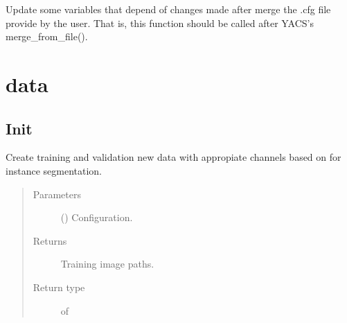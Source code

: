 \documentclass[letterpaper,10pt,english]{sphinxmanual}
\begin{document}
\begin{fulllineitems}

\begin{fulllineitems}
\label{\detokenize{config/config:config.config.Config.update_dependencies}}
Update some variables that depend of changes made after merge the .cfg file provide by the user. That is,
this function should be called after YACS’s merge\_from\_file().

\end{fulllineitems}


\end{fulllineitems}



\section{data}
\label{\detokenize{data/data:data}}\label{\detokenize{data/data::doc}}

\subsection{Init}
\label{\detokenize{data/init:module-data}}\label{\detokenize{data/init:init}}\label{\detokenize{data/init::doc}}

\begin{fulllineitems}
\label{\detokenize{data/init:data.create_train_val_instance_channels}}
Create training and validation new data with appropiate channels based on  for instance
segmentation.
\begin{quote}\begin{description}
\item[{Parameters}] \leavevmode
{} () \textendash{} Configuration.

\item[{Returns}] \leavevmode
{} \textendash{} Training image paths.

\item[{Return type}] \leavevmode
{} of 

\end{description}\end{quote}

\end{fulllineitems}
\end{document}
